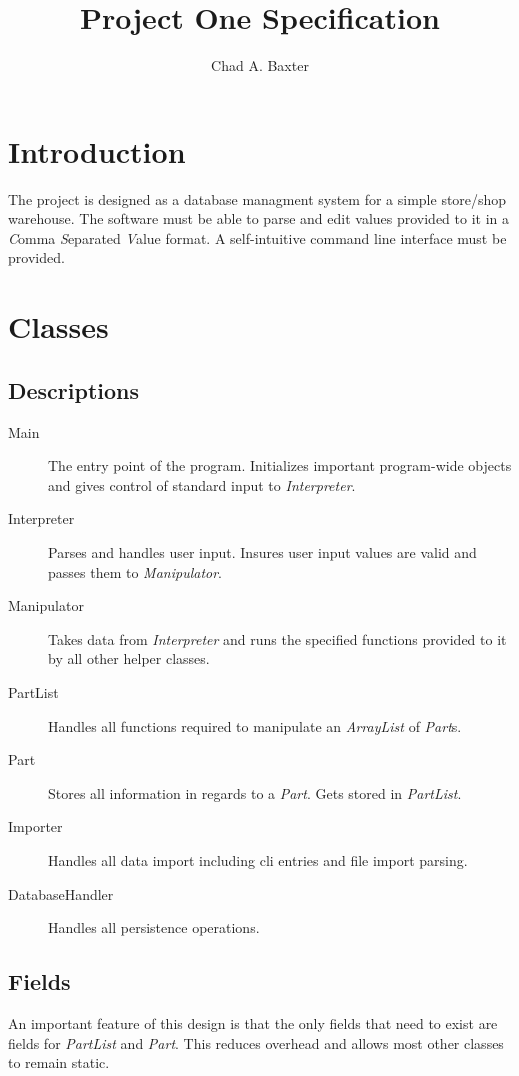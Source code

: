 \documentclass{report}
\begin{document}
\title{Project One Specification}
\author{Chad A. Baxter}

\maketitle

\section{Introduction}
The project is designed as a database managment system for a simple store/shop warehouse. The software must be able to parse and edit values provided to it in a \textit{C}omma \textit{S}eparated \textit{V}alue format. A self-intuitive command line interface must be provided.

\section{Classes}
\subsection{Descriptions}
\begin{description}
  \item [Main] The entry point of the program. Initializes important program-wide objects and gives control of standard input to \textit{Interpreter}.
  \item [Interpreter] Parses and handles user input. Insures user input values are valid and passes them to \textit{Manipulator}.
  \item [Manipulator] Takes data from \textit{Interpreter} and runs the specified functions provided to it by all other helper classes.
  \item [PartList] Handles all functions required to manipulate an \textit{ArrayList} of \textit{Part}s.
  \item [Part] Stores all information in regards to a \textit{Part}. Gets stored in \textit{PartList}.
  \item [Importer] Handles all data import including cli entries and file import parsing.
  \item [DatabaseHandler] Handles all persistence operations.
\end{description}

\subsection{Fields}
An important feature of this design is that the only fields that need to exist are fields for \textit{PartList} and \textit{Part}. This reduces overhead and allows most other classes to remain static.
\end{document}
